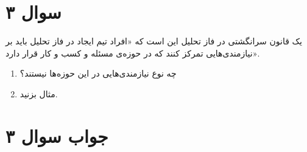 \section*{سوال ۳}

یک قانون سرانگشتی در فاز تحلیل این است که «افراد تیم ایجاد در فاز تحلیل باید بر نیازمندی‌هایی تمرکز کنند که در حوزه‌ی مسئله و کسب و کار قرار دارد».
\begin{enumerate}
	\item چه نوع نیازمندی‌هایی در این حوزه‌ها نیستند؟
	\item مثال بزنید.
\end{enumerate}

\section*{جواب سوال ۳}

